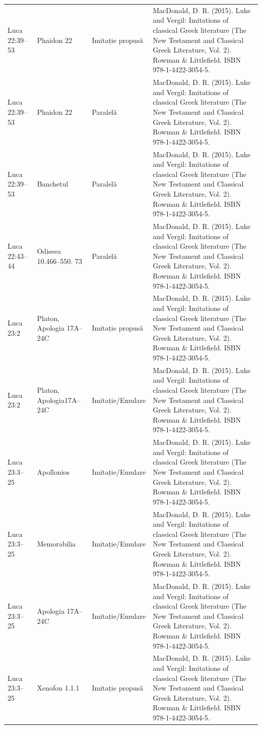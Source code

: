 \documentclass[12pt,a4paper,twoside,openany]{book}
\begin{document}
\begin{longtable}{L{1.4cm}L{1.7cm}L{3.1cm}L{8.4cm}}
Luca 22:39–53 & Phaidon 22 & Imitație propusă & MacDonald, D. R. (2015). Luke and Vergil: Imitations of classical Greek literature (The New Testament and Classical Greek Literature, Vol. 2). Rowman \& Littlefield. ISBN 978-1-4422-3054-5. \\
Luca 22:39–53 & Phaidon 22 & Paralelă & MacDonald, D. R. (2015). Luke and Vergil: Imitations of classical Greek literature (The New Testament and Classical Greek Literature, Vol. 2). Rowman \& Littlefield. ISBN 978-1-4422-3054-5. \\
Luca 22:39–53 & Banchetul & Paralelă & MacDonald, D. R. (2015). Luke and Vergil: Imitations of classical Greek literature (The New Testament and Classical Greek Literature, Vol. 2). Rowman \& Littlefield. ISBN 978-1-4422-3054-5. \\
Luca 22:43–44 & Odiseea 10.466–550. 73 & Paralelă & MacDonald, D. R. (2015). Luke and Vergil: Imitations of classical Greek literature (The New Testament and Classical Greek Literature, Vol. 2). Rowman \& Littlefield. ISBN 978-1-4422-3054-5. \\
Luca 23:2 & Platon, Apologia 17A–24C & Imitație propusă & MacDonald, D. R. (2015). Luke and Vergil: Imitations of classical Greek literature (The New Testament and Classical Greek Literature, Vol. 2). Rowman \& Littlefield. ISBN 978-1-4422-3054-5. \\
Luca 23:2 & Platon, Apologia17A–24C & Imitație/Emulare & MacDonald, D. R. (2015). Luke and Vergil: Imitations of classical Greek literature (The New Testament and Classical Greek Literature, Vol. 2). Rowman \& Littlefield. ISBN 978-1-4422-3054-5. \\
Luca 23:3–25 & Apollonios & Imitație/Emulare & MacDonald, D. R. (2015). Luke and Vergil: Imitations of classical Greek literature (The New Testament and Classical Greek Literature, Vol. 2). Rowman \& Littlefield. ISBN 978-1-4422-3054-5. \\
Luca 23:3–25 & Memorabilia & Imitație/Emulare & MacDonald, D. R. (2015). Luke and Vergil: Imitations of classical Greek literature (The New Testament and Classical Greek Literature, Vol. 2). Rowman \& Littlefield. ISBN 978-1-4422-3054-5. \\
Luca 23:3–25 & Apologia 17A–24C & Imitație/Emulare & MacDonald, D. R. (2015). Luke and Vergil: Imitations of classical Greek literature (The New Testament and Classical Greek Literature, Vol. 2). Rowman \& Littlefield. ISBN 978-1-4422-3054-5. \\
Luca 23:3–25 & Xenofon 1.1.1 & Imitație propusă & MacDonald, D. R. (2015). Luke and Vergil: Imitations of classical Greek literature (The New Testament and Classical Greek Literature, Vol. 2). Rowman \& Littlefield. ISBN 978-1-4422-3054-5. \\

\end{longtable}
\end{document}

